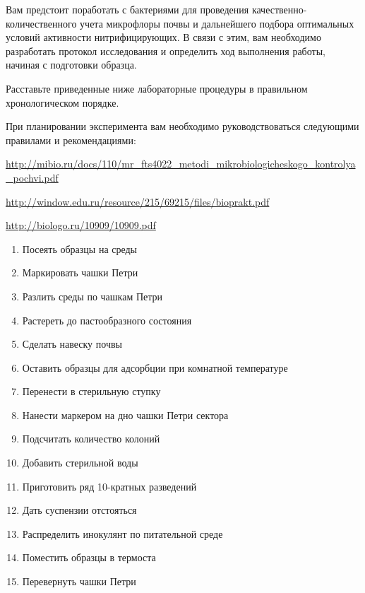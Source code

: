 
Вам предстоит поработать с бактериями для проведения качественно- количественного учета микрофлоры 
почвы и дальнейшего подбора оптимальных условий  активности нитрифицирующих. В связи с этим,  
вам необходимо разработать протокол исследования и определить ход выполнения работы, начиная с 
подготовки образца.

Расставьте приведенные ниже лабораторные процедуры в правильном хронологическом порядке. 

При планировании эксперимента вам необходимо руководствоваться следующими правилами и рекомендациями:

\noindent\url{http://mibio.ru/docs/110/mr_fts4022_metodi_mikrobiologicheskogo_kontrolya_pochvi.pdf}

\noindent\url{http://window.edu.ru/resource/215/69215/files/bioprakt.pdf}

\noindent\url{http://biologo.ru/10909/10909.pdf}

\begin{enumerate}
    \item Посеять образцы на среды
    \item Маркировать чашки Петри
    \item Разлить среды по чашкам Петри
    \item Растереть до пастообразного состояния
    \item Сделать навеску почвы
    \item Оставить образцы для адсорбции при комнатной температуре
    \item Перенести в стерильную ступку
    \item Нанести маркером на дно чашки Петри сектора
    \item Подсчитать количество колоний
    \item Добавить стерильной воды
    \item Приготовить ряд 10-кратных разведений
    \item Дать суспензии отстояться
    \item Распределить инокулянт по питательной среде
    \item Поместить образцы в термоста
    \item Перевернуть чашки Петри
\end{enumerate}
